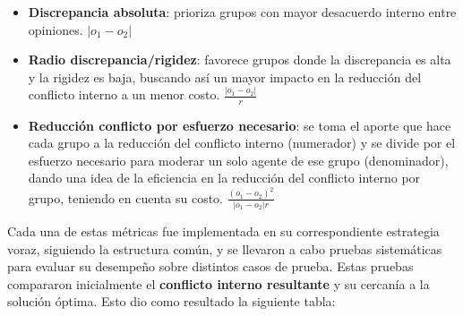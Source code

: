 \begin{itemize}
	\item \textbf{Discrepancia absoluta}: prioriza grupos con mayor desacuerdo interno entre opiniones.
	$|o_1 - o_2|$

	\item \textbf{Radio discrepancia/rigidez}: favorece grupos donde la discrepancia es alta y la rigidez es baja, buscando así un mayor impacto en la reducción del conflicto interno a un menor costo.
	$\frac{ |o_1 - o_2| }{ r }$

	\item \textbf{Reducción conflicto por esfuerzo necesario}: se toma el aporte que hace cada grupo a la reducción del conflicto interno (numerador) y se divide por el esfuerzo necesario para moderar un solo agente de ese grupo (denominador), dando una idea de la eficiencia en la reducción del conflicto interno por grupo, teniendo en cuenta su costo.
	$\frac{ (o_1 - o_2)^2 }{ |o_1 - o_2| r }$
\end{itemize}

Cada una de estas métricas fue implementada en su correspondiente estrategia voraz, siguiendo la estructura común, y se llevaron a cabo pruebas sistemáticas para evaluar su desempeño sobre distintos casos de prueba. Estas pruebas compararon inicialmente el \textbf{conflicto interno resultante} y su cercanía a la solución óptima. Esto dio como resultado la siguiente tabla:

